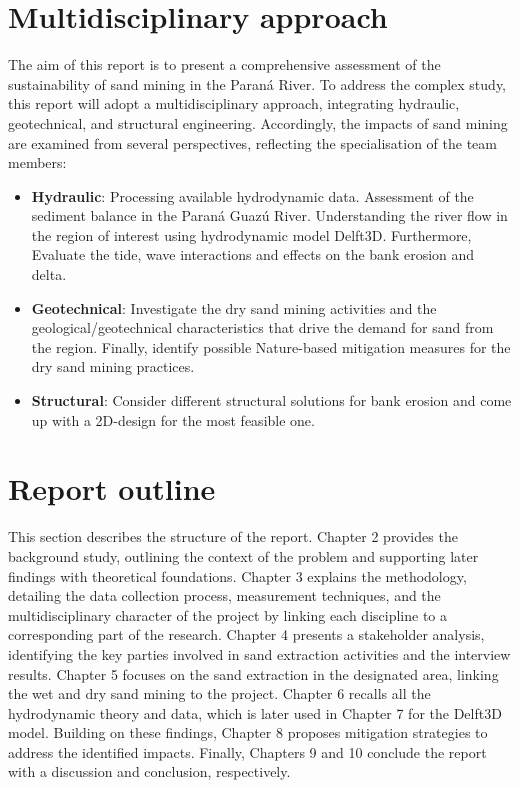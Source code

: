 \section{Multidisciplinary approach}
The aim of this report is to present a comprehensive assessment of the sustainability of sand mining in the Paraná River.
To address the complex study, this report will adopt a multidisciplinary approach, integrating hydraulic, geotechnical, and structural engineering.
Accordingly, the impacts of sand mining are examined from several perspectives, reflecting the specialisation of the team members:

\begin{itemize}
    \item \textbf{Hydraulic}: 
    Processing available hydrodynamic data.
    Assessment of the sediment balance in the Paraná Guazú River.
    Understanding the river flow in the region of interest using hydrodynamic model Delft3D. Furthermore, Evaluate the tide, wave interactions and effects on the bank erosion and delta. 
    
    \item \textbf{Geotechnical}: 
    Investigate the dry sand mining activities and the geological/geotechnical characteristics that drive the demand for sand from the region. Finally, identify possible Nature-based mitigation measures for the dry sand mining practices.
    \item \textbf{Structural}: Consider different structural solutions for bank erosion and come up with a 2D-design for the most feasible one.
\end{itemize}

\section{Report outline}
\label{section: report outline}
This section describes the structure of the report. Chapter 2 provides the background study, outlining the context of the problem and supporting later findings with theoretical foundations. Chapter 3 explains the methodology, detailing the data collection process, measurement techniques, and the multidisciplinary character of the project by linking each discipline to a corresponding part of the research. Chapter 4 presents a stakeholder analysis, identifying the key parties involved in sand extraction activities and the interview results. Chapter 5 focuses on the sand extraction in the designated area, linking the wet and dry sand mining to the project. Chapter 6 recalls all the hydrodynamic theory and data, which is later used in Chapter 7 for the Delft3D model. Building on these findings, Chapter 8 proposes mitigation strategies to address the identified impacts. Finally, Chapters 9 and 10 conclude the report with a discussion and conclusion, respectively.